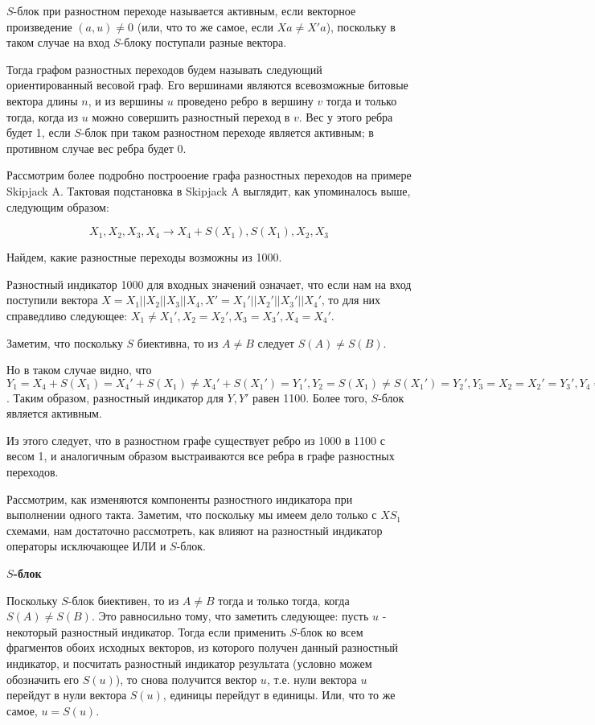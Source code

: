 \documentclass[a4paper,12pt]{extarticle}
\theoremstyle{plain} %
\begin{document}
\begin{large}
$S$-блок при разностном переходе называется активным, если векторное произведение $(a, u) \neq 0$ (или, что то же самое, если $Xa \neq X'a$), поскольку в таком случае на вход $S$-блоку поступали разные вектора.

Тогда графом разностных переходов будем называть следующий ориентированный весовой граф. Его вершинами являются всевозможные битовые вектора длины $n$, и из вершины $u$ проведено ребро в вершину $v$ тогда и только тогда, когда из $u$ можно совершить разностный переход в $v$. Вес у этого ребра будет 1, если $S$-блок при таком разностном переходе является активным; в противном случае вес ребра будет 0.

Рассмотрим более подробно построоение графа разностных переходов на примере Skipjack A. Тактовая подстановка в Skipjack A выглядит, как упоминалось выше, следующим образом:

$$X_1, X_2, X_3, X_4 \rightarrow X_4 + S(X_1), S(X_1), X_2, X_3$$

Найдем, какие разностные переходы возможны из 1000.

Разностный индикатор 1000 для входных значений означает, что если нам на вход поступили вектора $X=X_1||X_2||X_3||X_4, X'=X_1'||X_2'||X_3'||X_4'$, то для них справедливо следующее: $X_1\neq X_1', X_2=X_2', X_3 = X_3', X_4 = X_4'$. 

Заметим, что поскольку $S$ биективна, то из $A \neq B$ следует $S(A) \neq S(B)$.

Но в таком случае видно, что $Y_1=X_4 + S(X_1)=X_4' + S(X_1)\neq X_4' + S(X_1')=Y_1', Y_2=S(X_1)\neq S(X_1')=Y_2', Y_3=X_2=X_2'=Y_3', Y_4=X_3= X_3'=Y_4'$. Таким образом, разностный индикатор для $Y, Y'$ равен 1100. Более того, $S$-блок является активным.

Из этого следует, что в разностном графе существует ребро из 1000 в 1100 с весом 1, и аналогичным образом выстраиваются все ребра в графе разностных переходов.

Рассмотрим, как изменяются компоненты разностного индикатора при выполнении одного такта. Заметим, что поскольку мы имеем дело только с $XS_1$ схемами, нам достаточно рассмотреть, как влияют на разностный индикатор операторы исключающее ИЛИ и $S$-блок.


\textbf{$S$-блок}

Поскольку $S$-блок биективен, то из $A \neq B$ тогда и только тогда, когда $S(A) \neq S(B)$. Это равносильно тому, что заметить следующее: пусть $u$ - некоторый разностный индикатор. Тогда если применить $S$-блок ко всем фрагментов обоих исходных векторов, из которого получен данный разностный индикатор, и посчитать разностный индикатор результата (условно можем обозначить его $S(u)$), то снова получится вектор $u$, т.е. нули вектора $u$ перейдут в нули вектора $S(u)$, единицы перейдут в единицы. Или, что то же самое, $u=S(u)$.


\end{large}
\end{document}
